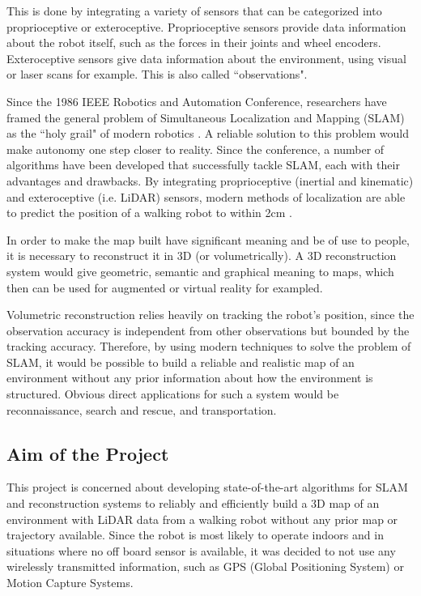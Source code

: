 \documentclass[11pt]{article}
\begin{document}
This is done by integrating a variety of sensors that can be categorized into proprioceptive or exteroceptive. Proprioceptive sensors provide data information about the robot itself, such as the forces in their joints and wheel encoders. Exteroceptive sensors give data information about the environment, using visual or laser scans for example. This is also called ``observations".
	
Since the 1986 IEEE Robotics and Automation Conference, researchers have framed the general problem of Simultaneous Localization and Mapping (SLAM) as the ``holy grail" of modern robotics \cite{SLAMPartI}. A reliable solution to this problem would make autonomy one step closer to reality. Since the conference, a number of algorithms have been developed that successfully tackle SLAM, each with their advantages and drawbacks. By integrating proprioceptive (inertial and kinematic) and exteroceptive (i.e. LiDAR) sensors, modern methods of localization are able to predict the position of a walking robot to within 2cm \cite{7041346}.
	
In order to make the map built have significant meaning and be of use to people, it is necessary to reconstruct it in 3D (or volumetrically). A 3D reconstruction system would give geometric, semantic and graphical meaning to maps, which then can be used for augmented or virtual reality for exampled.
	
Volumetric reconstruction relies heavily on tracking the robot's position, since the observation accuracy is independent from other observations but bounded by the tracking accuracy. Therefore, by using modern techniques to solve the problem of SLAM, it would be possible to build a reliable and realistic map of an environment without any prior information about how the environment is structured. Obvious direct applications for such a system would be reconnaissance, search and rescue, and transportation.
	
	\subsection{Aim of the Project}

This project is concerned about developing state-of-the-art algorithms for SLAM and reconstruction systems to reliably and efficiently build a 3D map of an environment with LiDAR data from a walking robot without any prior map or trajectory available. Since the robot is most likely to operate indoors and in situations where no off board sensor is available, it was decided to not use any wirelessly transmitted information, such as GPS (Global Positioning System) or Motion Capture Systems.
	
\end{document}

